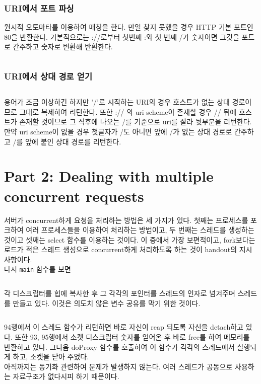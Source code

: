 \documentclass{report}
\begin{document}
\inputminted[firstline=376,lastline=422, linenos, breaklines]{C}{../submit/proxy.c}

\subsubsection{URI에서 포트 파싱}
원시적 오토마타를 이용하여 매칭을 한다. 만일 찾지 못했을 경우 HTTP 기본 포트인 80을 반환한다. 기본적으로는 ://로부터 첫번째 :와 첫 번째 /가 숫자이면 그것을 포트로 간주하고 숫자로 변환해 반환한다.

\inputminted[firstline=475,lastline=518, linenos, breaklines]{C}{../submit/proxy.c}

\subsubsection{URI에서 상대 경로 얻기}
\inputminted[firstline=424,lastline=473, linenos, breaklines]{C}{../submit/proxy.c}
용어가 조금 이상하긴 하지만 '/'로 시작하는 URI의 경우 호스트가 없는 상대 경로이므로 그대로 복제하여 리턴한다.
또한 :// 의 uri scheme이 존재할 경우 // 뒤에 호스트가 존재할 것이므로 그 직후에 나오는 /를 기준으로 uri를 잘라 뒷부분을 리턴한다. 만약 uri scheme이 없을 경우 첫글자가 /도 아니면 앞에 /가 없는 상대 경로로 간주하고 /를 앞에 붙인 상대 경로를 리턴한다.

\section{Part 2: Dealing with multiple concurrent requests}
서버가 concurrent하게 요청을 처리하는 방법은 세 가지가 있다. 첫째는 프로세스를 포크하여 여러 프로세스들을 이용하여 처리하는 방법이고, 두 번째는 스레드를 생성하는 것이고 셋째는 select 함수를 이용하는 것이다. 이 중에서 가장 보편적이고, fork보다는 로드가 적은 스레드 생성으로 concurrent하게 처리하도록 하는 것이 handout의 지시 사항이다.
\\
다시 \lstinline{main} 함수를 보면
\inputminted[firstline=83,lastline=85, linenos, breaklines]{C}{../submit/proxy.c}
각 디스크립터를 힙에 복사한 후 그 각각의 포인터를 스레드의 인자로 넘겨주며 스레드를 만들고 있다. 이것은 의도치 않은 변수 공유를 막기 위한 것이다.
\inputminted[firstline=92,lastline=100, linenos, breaklines]{C}{../submit/proxy.c}
94행에서 이 스레드 함수가 리턴하면 바로 자신이 reap 되도록 자신을 detach하고 있다. 또한 93, 95행에서 소켓 디스크립터 숫자를 얻어온 후 바로 free를 하여 메모리를 반환하고 있다. 그다음 doProxy 함수를 호출하여 이 함수가 각각의 스레드에서 실행되게 하고, 소켓을 닫아 주었다.
\\
아직까지는 동기화 관련하여 문제가 발생하지 않는다. 여러 스레드가 공동으로 사용하는 자료구조가 없다시피 하기 때문이다.
\end{document}
